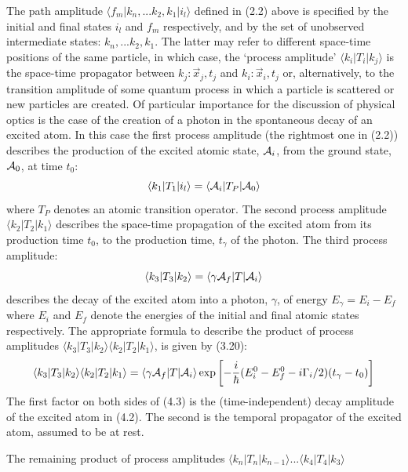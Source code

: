 \documentclass [12pt]{article}
\begin{document}
{ \par  The path amplitude $\langle f_m|k_n,...k_2,k_1|i_l \rangle$ defined in (2.2)
  above  is specified by the initial and final states
  $i_l$ and $f_m$ respectively, and by the set of unobserved intermediate states: $k_n,...k_2,k_1$.
   The latter may refer to different space-time positions of the same particle, in which case,
   the `process amplitude'
    $ \langle k_i|T_i|k_j\rangle$ is the space-time propagator between $k_j: \vec{x}_j , t_j$ and
   $k_i: \vec{x}_i , t_j$ or, alternatively, to the transition amplitude of some quantum
   process in which a particle is scattered or new particles are created. Of particular importance
   for the discussion of physical optics is the case of the creation of a photon in the spontaneous
  decay of an excited atom.  In this case 
  the first process amplitude (the rightmost one in (2.2)) describes the production of the
  excited atomic state, ${\cal A}_i$, from the ground state, ${\cal A}_0$, at time $t_0$:
  \begin{equation}
   \langle k_1|T_1|i_l\rangle =  \langle {\cal A}_i|T_P| {\cal A}_0 \rangle
 \end{equation} 
 where $T_P$ denotes an atomic transition operator. The second process amplitude  $\langle k_2|T_2|k_1\rangle$  
 describes the space-time propagation of the excited atom from its production time $t_0$, to the production time,
  $t_{\gamma}$ of the photon.
  The third process amplitude:
   \begin{equation}
   \langle k_3|T_3|k_2\rangle = \langle \gamma  {\cal A}_f|T| {\cal A}_i\rangle   
 \end{equation} 
  describes the decay of the excited atom into a photon, $ \gamma$, of energy 
  $E_{\gamma} = E_i-E_f$ where $E_i$ and $E_f$ denote the energies of the initial and final
  atomic states respectively. The appropriate formula to describe the product of process
  amplitudes  $\langle k_3|T_3|k_2\rangle\langle k_2|T_2|k_1\rangle$, is given by (3.20):
    \begin{equation}
\langle k_3|T_3|k_2\rangle\langle k_2|T_2|k_1\rangle =  \langle \gamma  {\cal A}_f|T| {\cal A}_i\rangle
   \exp\left[ -\frac{i}{\hbar}(E_i^0-E_f^0-i\Gamma_i/2)(t_{\gamma}-t_0)\right]
  \end{equation} 
    The first factor on both sides of (4.3) is the (time-independent) decay amplitude of the excited
   atom  in (4.2). The second is the temporal propagator of the excited atom, assumed to be
   at rest.
  \par The remaining product of process amplitudes $\langle k_{n}|T_n|k_{n-1}\rangle...\langle k_4|T_4|k_3\rangle$
}
\end{document}
